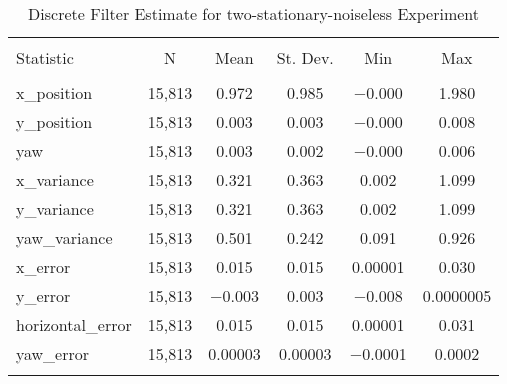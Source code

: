 
\begin{table}[h] \centering 
  \caption{Discrete Filter Estimate for two-stationary-noiseless Experiment} 
  \label{tab:two_stationary_noiseless_discrete_summary} 
\begin{tabular}{@{\extracolsep{5pt}}lccccc} 
\\[-1.8ex]\hline 
\hline \\[-1.8ex] 
Statistic & \multicolumn{1}{c}{N} & \multicolumn{1}{c}{Mean} & \multicolumn{1}{c}{St. Dev.} & \multicolumn{1}{c}{Min} & \multicolumn{1}{c}{Max} \\ 
\hline \\[-1.8ex] 
x\_position & 15,813 & \num{0.972} & \num{0.985} & $-$0.000 & \num{1.980} \\ 
y\_position & 15,813 & \num{0.003} & \num{0.003} & $-$0.000 & \num{0.008} \\ 
yaw & 15,813 & \num{0.003} & \num{0.002} & $-$0.000 & \num{0.006} \\ 
x\_variance & 15,813 & \num{0.321} & \num{0.363} & \num{0.002} & \num{1.099} \\ 
y\_variance & 15,813 & \num{0.321} & \num{0.363} & \num{0.002} & \num{1.099} \\ 
yaw\_variance & 15,813 & \num{0.501} & \num{0.242} & \num{0.091} & \num{0.926} \\ 
x\_error & 15,813 & \num{0.015} & \num{0.015} & \num{0.00001} & \num{0.030} \\ 
y\_error & 15,813 & $-$0.003 & \num{0.003} & $-$0.008 & \num{0.0000005} \\ 
horizontal\_error & 15,813 & \num{0.015} & \num{0.015} & \num{0.00001} & \num{0.031} \\ 
yaw\_error & 15,813 & \num{0.00003} & \num{0.00003} & $-$0.0001 & \num{0.0002} \\ 
\hline \\[-1.8ex] 
\end{tabular} 
\end{table} 
